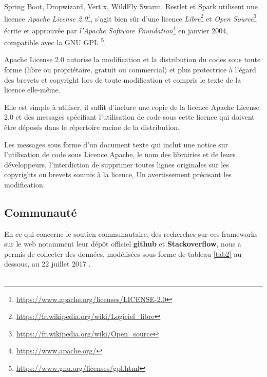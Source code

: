 \documentclass[12pt, a4paper, openany]{report}
\begin{document}
   Spring Boot, Dropwizard, Vert.x, WildFly Swarm, Restlet et Spark utilisent une licence \textit{Apache License 2.0}\footnote{\url{https://www.apache.org/licenses/LICENSE-2.0}}, s'agit bien sûr d'une licence \textit{Libre}\footnote{\url{https://fr.wikipedia.org/wiki/Logiciel_libre}} et \textit{Open Source}\footnote{\url{https://fr.wikipedia.org/wiki/Open_source}} écrite et approuvée par \textit{l'Apache Software Foundation}\footnote{\url{https://www.apache.org/}} en janvier 2004, compatible avec la GNU GPL \footnote{\url{https://www.gnu.org/licenses/gpl.html}}.
   
   Apache License 2.0 autorise la modification et la distribution du codes sous toute forme (libre ou propriétaire, gratuit ou commercial) et plus protectrice à l’égard des brevets et copyright lors de toute modification et compris le texte de la licence elle-même.
   
   Elle est simple à utiliser, il suffit d’inclure une copie de la licence Apache License 2.0 et des messages spécifiant l’utilisation de code sous cette licence qui doivent être déposés dans le répertoire racine de la distribution.
   
   Les messages sous forme d'un document texte qui inclut une notice sur l'utilisation de code sous Licence Apache, le nom des librairies et de leurs développeurs, l'interdiction de supprimer toutes lignes originales sur les copyrights ou brevets soumis à la licence, Un avertissement précisant les modification.
   
   
  
  \subsection{Communauté}
   
     En ce qui concerne le soutien communautaire, des recherches sur ces frameworks sur le web notamment leur dépôt officiel \textbf{github} et \textbf{Stackoverflow}, nous a permis de collecter des données, modélisées sous forme de tableau \ref{tab2} au-dessous, au 22 juillet 2017 . \\  \\
   
\end{document}
